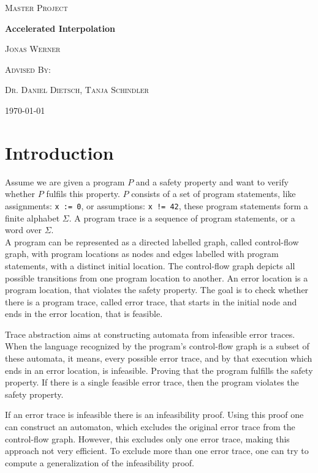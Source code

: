 \documentclass{article}
\begin{document}
	\newcommand{\HorizontalLine}{\rule{\linewidth}{0.3mm}}
	
		\begin{center}
		{\scshape\Large Master Project \par}
		\vspace{1.5cm}
		{\huge\bfseries Accelerated Interpolation \par}
		\vspace{1cm}
		{\large \scshape Jonas Werner\par}
		\vspace{0.5cm}
		{\large \scshape Advised By: \par}
		{\large \scshape Dr. Daniel Dietsch, Tanja Schindler \par}
		\vspace{0.5cm}
		{\today \vspace{2cm}} 
		\end{center}

\section{Introduction}
Assume we are given a program $P$ and a safety property and want to verify whether $P$ fulfils this property. $P$ consists of a set of program statements, like assignments: \texttt{x := 0}, or assumptions: \texttt{x != 42}, these program statements form a finite alphabet $\Sigma$. A program trace is a sequence of program statements, or a word over $\Sigma$. \\
A program can be represented as a directed labelled graph, called control-flow graph, with program locations as nodes and edges labelled with program statements, with a distinct initial location. The control-flow graph depicts all possible transitions from one program location to another. An error location is a program location, that violates the safety property. The goal is to check whether there is a program trace, called error trace, that starts in the initial node and ends in the error location, that is feasible. 

Trace abstraction aims at constructing automata \cite{10.1007/978-3-642-39799-8_2} from infeasible error traces. When the language recognized by the program's control-flow graph is a subset of these automata, it means, every possible error trace, and by that execution which ends in an error location, is infeasible. Proving that the program fulfills the safety property. If there is a single feasible error trace, then the program violates the safety property.\\
\par 
If an error trace is infeasible there is an infeasibility proof. Using this proof one can construct an automaton, which excludes the original error trace from the control-flow graph. However, this excludes only one error trace, making this approach not very efficient. To exclude more than one error trace, one can try to compute a generalization of the infeasibility proof. \par
\end{document}
